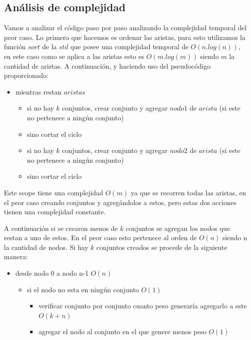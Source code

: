 \subsection{Análisis de complejidad}

Vamos a analizar el código paso por paso analizando la complejidad temporal del peor caso.
Lo primero que hacemos es ordenar las aristas, para esto utilizamos la función $sort$ de la $std$ que posee una complejidad temporal de $O(n.log(n))$, en este caso como se aplica a las aristas esto es $O(m.log(m))$ siendo $m$ la cantidad de aristas.
A continuación, y haciendo uso del pseudocódigo proporcionado:
\begin{itemize}
\item mientras restan $aristas$ 
  \begin{itemize}
  \item si no hay $k$ conjuntos, crear conjunto y agregar $nodo1$ de $arista$ (si este no pertenece a ningún conjunto)
  \item sino cortar el ciclo  
  \item si no hay $k$ conjuntos, crear conjunto y agregar $nodo2$ de $arista$ (si este no pertenece a ningún conjunto)
  \item sino cortar el ciclo  
  \end{itemize}
\end{itemize}
Este scope tiene una complejidad $O(m)$ ya que se recorren todas las aristas, en el peor caso creando conjuntos y agregándolos a estos, pero estas dos acciones tienen una complejidad constante.

A continuación si se crearon menos de $k$ conjuntos se agregan los nodos que restan a uno de estos. En el peor caso esto pertenece al orden de $O(n)$ siendo n la cantidad de nodos.
Si hay $k$ conjuntos creados se procede de la siguiente manera:
\begin{itemize}
\item desde nodo 0 a nodo n-1   $O(n)$
  \begin{itemize}
  \item si el nodo no esta en ningún conjunto $O(1)$
    \begin{itemize}
      \item verificar conjunto por conjunto cuanto peso generaría agregarlo a este $O(k+n)$
      \item agregar el nodo al conjunto en el que genere menos peso $O(1)$
    \end{itemize}
  \end{itemize}
\end{itemize}

